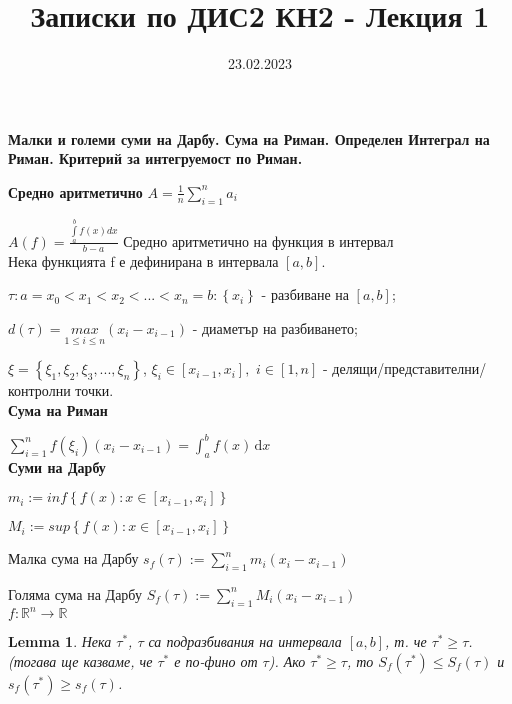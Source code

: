 \documentclass[12pt]{article}
\newtheorem{lemma}{Lemma}
\begin{document}
	\color{white}
	\pagecolor{darkgray}
	\title{Записки по ДИС2 КН2 - Лекция 1}
	\date{23.02.2023}
	\maketitle
	\begin{center}
		\Large
		\textbf{Малки и големи суми на Дарбу. Сума на Риман. Определен Интеграл на Риман. Критерий за интегруемост по Риман.}
	\end{center}
	\textbf{Средно аритметично}
	$A=\frac{1}{n}\sum _{i=1}^{n}{a}_{i}$
	
	
	$A\left(f\right)=\frac{\underset{a}{\overset{b}{\int }}f\left(x\right)dx}{b-a} $ Средно аритметично на функция в интервал
	\\
	
	Нека функцията f е дефинирана в интервала $\left[a, b\right]$.
	
	$\tau : a=x_{0}<x_{1}<x_{2}<...<x_{n}=b : \left\{x_{i}\right\}$ - разбиване на $\left[a, b\right]$;
	
	$d\left(\tau\right)=\underset{1\leq i\leq n}{max}\left(x_{i} - x_{i-1}\right)$ - диаметър на разбиването;
	
	$\xi = \left\{\xi_{1}, \xi_{2}, \xi_{3}, ..., \xi _{n}\right\}$, $\xi_{i} \in \left[x_{i-1}, x_{i}\right],$ $i \in \left[1, n\right]$ - делящи/представителни/контролни точки.
	\\ 
	
	\textbf{Сума на Риман}
	
	$\sum _{i=1}^{n} f\left(\xi _{i}\right)\left(x_{i} - x_{i-1}\right) = \int_{a}^{b}f(x)\,\mathrm{d}x$
	\\
	
	\textbf{Суми на Дарбу}
	
	$m_{i} := inf\left\{f\left(x\right): x\in \left[x_{i-1}, x_{i}\right]\right\}$
	
	$M_{i} := sup\left\{f\left(x\right): x\in \left[x_{i-1}, x_{i}\right]\right\}$
	
	
	Малка сума на Дарбу 
	$s_{f}\left(\tau\right) := \sum _{i=1}^{n} m_{i}\left(x_{i}-x_{i-1}\right)$
	
	Голяма сума на Дарбу
	$S_{f}\left(\tau\right) := \sum _{i=1}^{n} M_{i}\left(x_{i}-x_{i-1}\right)$
	\\
	
	$f: \mathbb{R}^{n} \rightarrow \mathbb{R}$
	\begin{lemma}
		Нека $\tau^{*}$, $\tau$ са подразбивания на интервала $\left[a, b\right]$, т. че  $\tau^{*} \geq \tau$. 
		(тогава ще казваме, че $\tau^{*}$ е по-фино от $\tau$). 
		Ако $\tau^{*} \geq \tau$, то $S_{f}\left(\tau^{*}\right) \leq S_{f}\left(\tau\right)$ и $s_{f}\left(\tau^{*}\right) \geq s_{f}\left(\tau\right)$.
		\\
	\end{lemma}
	
\end{document}

